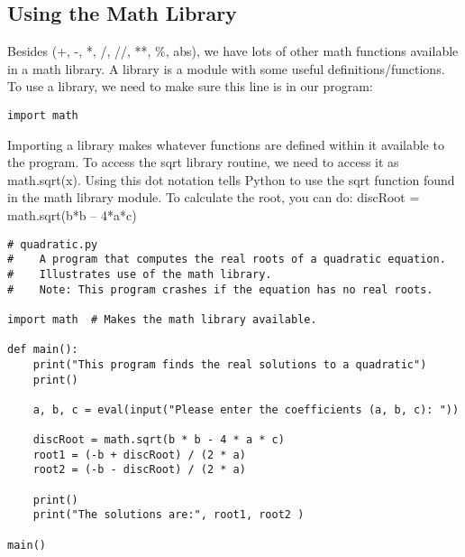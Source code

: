 \documentclass[12pt,a4paper,final,twoside,onecolumn,titlepage]{book}
\begin{document}
\subsection{Using the Math Library}
Besides (+, -, *, /, //, **, \%, abs), we have lots of other math functions available in a math library. A library is a module with some useful definitions/functions.  To use a library, we need to make sure this line is in our program:
\lstset{language=Python, tabsize=4}
\begin{lstlisting}
import math
\end{lstlisting}
Importing a library makes whatever functions are defined within it available to the program. To access the sqrt library routine, we need to access it as math.sqrt(x). Using this dot notation tells Python to use the sqrt function found in the math library module.
To calculate the root, you can do:
discRoot = math.sqrt(b*b – 4*a*c)
\lstset{language=Python, tabsize=4}
\begin{lstlisting}
# quadratic.py
#    A program that computes the real roots of a quadratic equation.
#    Illustrates use of the math library.
#    Note: This program crashes if the equation has no real roots.

import math  # Makes the math library available.

def main():
    print("This program finds the real solutions to a quadratic")
    print()

    a, b, c = eval(input("Please enter the coefficients (a, b, c): "))

    discRoot = math.sqrt(b * b - 4 * a * c)
    root1 = (-b + discRoot) / (2 * a)
    root2 = (-b - discRoot) / (2 * a)

    print()
    print("The solutions are:", root1, root2 )

main()
\end{lstlisting}
\end{document}
